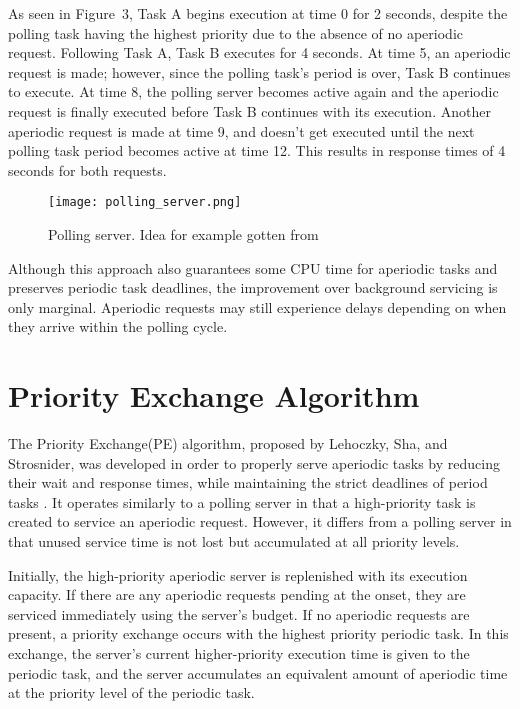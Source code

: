 \documentclass[conference]{IEEEtran}
\begin{document}
As seen in Figure~3, Task A begins execution at time 0 for 2 seconds, despite the polling task having the highest priority due to the absence of no aperiodic request. Following Task A, Task B executes for 4 seconds. At time 5, an aperiodic request is made; however, since the polling task's period is over, Task B continues to execute. At time 8, the polling server becomes active again and the aperiodic request is finally executed before Task B continues with its execution. Another aperiodic request is made at time 9, and doesn't get executed until the next polling task period becomes active at time 12. This results in response times of 4 seconds for both requests.

\begin{figure*}[!t]
  \centering
  \texttt{[image: polling\_server.png]}
  \caption{Polling server. Idea for example gotten from \cite{sprunt1990aperiodic}}
  \label{fig:polling_server}
\end{figure*}

Although this approach also guarantees some CPU time for aperiodic tasks and preserves periodic task deadlines, the improvement over background servicing is only marginal. Aperiodic requests may still experience delays depending on when they arrive within the polling cycle.




\section{Priority Exchange Algorithm}
The Priority Exchange(PE) algorithm, proposed by Lehoczky, Sha, and Strosnider, was developed in order to properly serve aperiodic tasks by reducing their wait and response times, while maintaining the strict deadlines of period tasks \cite{lehoczky1987enhanced}. It operates similarly to a polling server in that a high-priority task is created to service an aperiodic request. However, it differs from a polling server in that unused service time is not lost but accumulated at all priority levels. 
 
Initially, the high-priority aperiodic server is replenished with its execution capacity. If there are any aperiodic requests pending at the onset, they are serviced immediately using the server's budget. If no aperiodic requests are present, a priority exchange occurs with the highest priority periodic task. In this exchange, the server's current higher-priority execution time is given to the periodic task, and the server accumulates an equivalent amount of aperiodic time at the priority level of the periodic task. 
\end{document}
